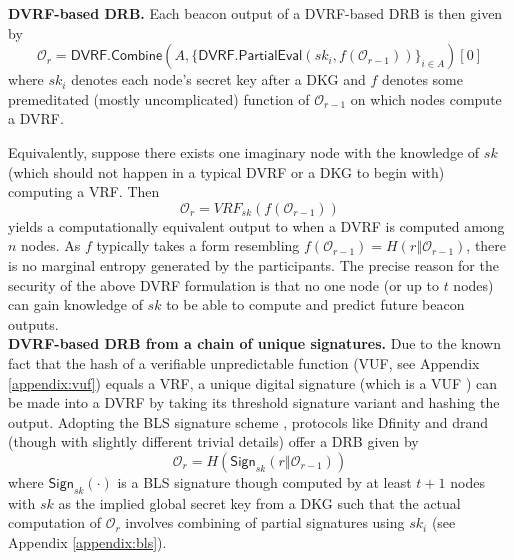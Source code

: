 \documentclass[letterpaper,twocolumn,10pt]{article}
\theoremstyle{definition}
\theoremstyle{remark}
\begin{document}
\noindent\textbf{DVRF-based DRB.} Each beacon output of a DVRF-based DRB is then given by
\begingroup\makeatletter\def\f@size{8}\check@mathfonts
\[
\mathcal{O}_r = \mathsf{DVRF.Combine}(A, \{\mathsf{DVRF.PartialEval}(sk_i, f(\mathcal{O}_{r - 1}))\}_{i \in A})[0]
\]\endgroup
where $sk_i$ denotes each node's secret key after a DKG and $f$ denotes some premeditated (mostly uncomplicated) function of $\mathcal{O}_{r - 1}$ on which nodes compute a DVRF.

Equivalently, suppose there exists one imaginary node with the knowledge of $sk$ (which should not happen in a typical DVRF or a DKG to begin with) computing a VRF. Then
\[
\mathcal{O}_r = VRF_{sk}(f(\mathcal{O}_{r - 1}))
\]
yields a computationally equivalent output to when a DVRF is computed among $n$ nodes. As $f$ typically takes a form resembling $f(\mathcal{O}_{r - 1}) = H(r \mathbin\Vert \mathcal{O}_{r - 1})$, there is no marginal entropy generated by the participants. The precise reason for the security of the above DVRF formulation is that no one node (or up to $t$ nodes) can gain knowledge of $sk$ to be able to compute and predict future beacon outputs.\\

\noindent\textbf{DVRF-based DRB from a chain of unique signatures.} Due to the known fact that the hash of a verifiable unpredictable function (VUF, see Appendix \ref{appendix:vuf}) equals a VRF, a unique digital signature (which is a VUF \cite{dodis2005verifiable}) can be made into a DVRF by taking its threshold signature variant \cite{boldyreva2003threshold} and hashing the output. Adopting the BLS signature scheme \cite{boneh2001short}, protocols like Dfinity \cite{hanke2018dfinity} and drand \cite{drand} (though with slightly different trivial details) offer a DRB given by
\[
\mathcal{O}_r = H(\mathsf{Sign}_{sk}(r \mathbin\Vert \mathcal{O}_{r - 1}))
\]
where $\mathsf{Sign}_{sk}(\cdot)$ is a BLS signature though computed by at least $t + 1$ nodes with $sk$ as the implied global secret key from a DKG such that the actual computation of $\mathcal{O}_r$ involves combining of partial signatures using $sk_i$ (see Appendix \ref{appendix:bls}).\\
\end{document}

